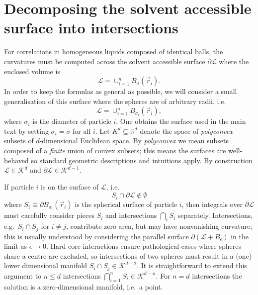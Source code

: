 \documentclass[11pt,twoside]{report}
\begin{document}
\section{Decomposing the solvent accessible surface into intersections}

For correlations in homogeneous liquids composed of identical balls, the curvatures must be computed across the solvent accessible surface $\partial\mathcal{L}$ where the enclosed volume is
\begin{equation*}
  \mathcal{L} = \cup_{i=1}^n B_\sigma(\vec{r}_i).
\end{equation*}
In order to keep the formulas as general as possible, we will consider a small generalisation of this surface where the spheres are of arbitrary radii, i.e.\
\begin{equation}\label{eq:generalised-volume}
  \mathcal{L} = \cup_{i=1}^n B_{\sigma_i}(\vec{r}_i),
\end{equation}
where $\sigma_i$ is the diameter of particle $i$.
One obtains the surface used in the main text by setting $\sigma_i = \sigma$ for all $i$.
Let $K^d \subseteq \mathbb{R}^d$ denote the space of \emph{polyconvex} subsets of $d$-dimensional Euclidean space.
By \emph{polyconvex} we mean subsets composed of a \emph{finite} union of convex subsets; this means the surfaces are well-behaved so standard geometric descriptions and intuitions apply.
By construction $\mathcal{L} \in \mathcal{K}^d$ and $\partial\mathcal{L} \in \mathcal{K}^{d-1}$.

If particle $i$ is on the surface of $\mathcal{L}$, i.e.
\begin{equation*}
  S_i %
  \cap \partial\mathcal{L} \notin \emptyset %
\end{equation*}
where $S_i \equiv \partial B_{\sigma_i}(\vec{r}_i)$ is the spherical surface of particle $i$, then integrals over $\partial\mathcal{L}$ must carefully consider pieces $S_i$ and intersections $\bigcap_i S_i$ separately.
Intersections, e.g.\ $S_i \cap S_j$ for $i \ne j$, contribute zero area, but may have nonvanishing curvature; this is usually understood by considering the parallel surface $\partial(\mathcal{L}+B_\epsilon)$ in the limit as $\epsilon \to 0$.
Hard core interactions ensure pathological cases where spheres share a centre are excluded, so intersections of two spheres must result in a (one) lower dimensional manifold $S_i \cap S_j \in \mathcal{K}^{d-2}$.
It is straightforward to extend this argument to $n \le d$ intersections $\bigcap_{i=1}^{n} S_i \in \mathcal{K}^{d-n}$.
For $n = d$ intersections the solution is a zero-dimensional manifold, i.e.\ a point.
\end{document}
